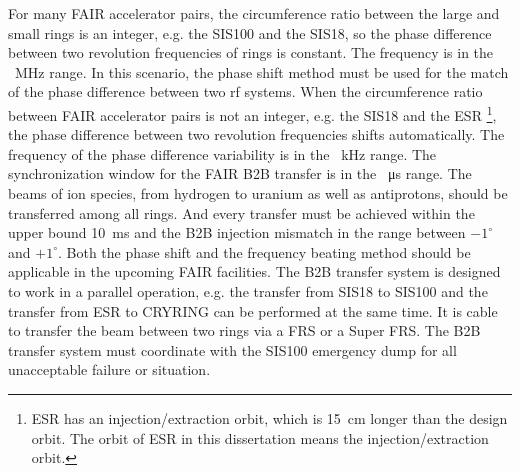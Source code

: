 For many FAIR accelerator pairs, the circumference ratio between the large and small rings is an integer, e.g. the SIS100 and the SIS18, so the phase difference between two revolution frequencies of rings is constant. The frequency is in the \SI{}{MHz} range. In this scenario, the phase shift method must be used for the match of the phase difference between two rf systems. When the circumference ratio between FAIR accelerator pairs is not an integer, e.g. the SIS18 and the ESR \footnote{ESR has an injection/extraction orbit, which is \SI{15}{cm} longer than the design orbit. The orbit of ESR in this dissertation means the injection/extraction orbit.}, the phase difference between two revolution frequencies shifts automatically. The frequency of the phase difference variability is in the \SI{}{kHz} range. The synchronization window for the FAIR B2B transfer is in the \SI{}{\micro\second} range. The beams of ion species, from hydrogen to uranium as well as antiprotons, should be transferred among all rings. And every transfer must be achieved within the upper bound \SI{10}{ms} and the B2B injection mismatch in the range between $-1^\circ$ and $+1^\circ$. Both the phase shift and the frequency beating method should be applicable in the upcoming FAIR facilities. The B2B transfer system is designed to work in a parallel operation, e.g. the transfer from SIS18 to SIS100 and the transfer from ESR to CRYRING can be performed at the same time. It is cable to transfer the beam between two rings via a FRS or a Super FRS. The B2B transfer system must coordinate with the SIS100 emergency dump for all unacceptable failure or situation. 


